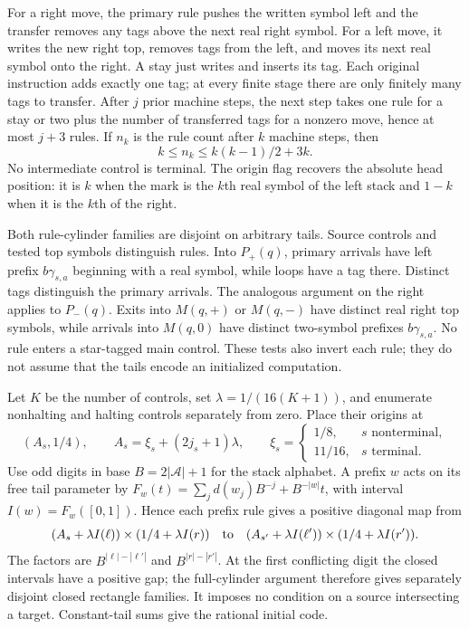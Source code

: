 For a right move, the primary rule pushes the written symbol left and
the transfer removes any tags above the next real right symbol.
For a left move, it writes the new right top, removes tags from the
left, and moves its next real symbol onto the right.  A stay just writes
and inserts its tag.  Each original instruction adds exactly one tag;
at every finite stage there are only finitely many tags to transfer.
After $j$ prior machine steps, the next step takes one rule for a stay
or two plus the number of transferred tags for a nonzero move, hence
at most $j+3$ rules.  If $n_k$ is the rule count after $k$ machine
steps, then
\[
 k\le n_k\le k(k-1)/2+3k.
\]
No intermediate control is terminal.  The origin flag recovers the
absolute head position: it is $k$ when the mark is the $k$th real
symbol of the left stack and $1-k$ when it is the $k$th of the right.

Both rule-cylinder families are disjoint on arbitrary tails.  Source
controls and tested top symbols distinguish rules.  Into $P_+(q)$,
primary arrivals have left prefix $b\gamma_{s,a}$ beginning with a
real symbol, while loops have a tag there.  Distinct tags distinguish
the primary arrivals.  The analogous argument on the right applies
to $P_-(q)$.  Exits into $M(q,+)$ or $M(q,-)$ have distinct
real right top symbols, while arrivals into $M(q,0)$ have distinct
two-symbol prefixes $b\gamma_{s,a}$.  No rule enters a star-tagged
main control.  These tests also invert each rule; they do not assume
that the tails encode an initialized computation.

Let $K$ be the number of controls, set $\lambda=1/(16(K+1))$,
and enumerate nonhalting and halting controls separately from zero.
Place their origins at
\[
 (A_s,1/4),\qquad A_s=\xi_s+(2j_s+1)\lambda,
 \qquad \xi_s=\begin{cases}1/8,&s\text{ nonterminal},\\
 11/16,&s\text{ terminal}.\end{cases}
\]
Use odd digits in base $B=2|\mathcal A|+1$ for the stack alphabet.
A prefix $w$ acts on its free tail parameter by
$F_w(t)=\sum_jd(w_j)B^{-j}+B^{-|w|}t$, with interval
$I(w)=F_w([0,1])$.  Hence each prefix rule gives a positive diagonal
map from
\[
 (A_s+\lambda I(\ell))\times(1/4+\lambda I(r))
 \quad\hbox{to}\quad
 (A_{s'}+\lambda I(\ell'))\times(1/4+\lambda I(r')).
\]
The factors are $B^{|\ell|-|\ell'|}$ and
$B^{|r|-|r'|}$.  At the first conflicting digit the closed intervals
have a positive gap; the full-cylinder argument therefore gives
separately disjoint closed rectangle families.  It imposes no condition
on a source intersecting a target.  Constant-tail sums give the rational
initial code.

